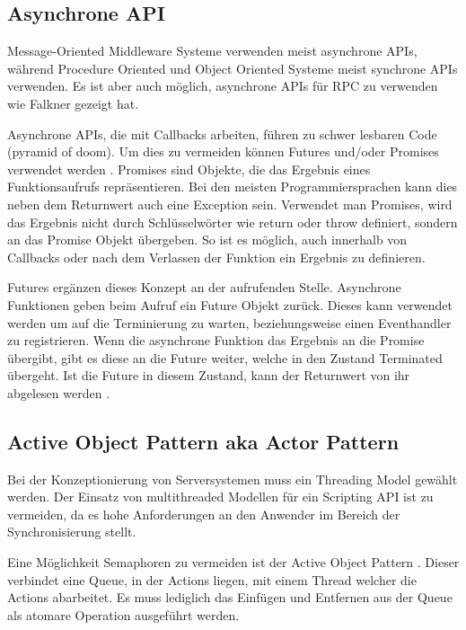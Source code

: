 \subsection{Asynchrone API}
Message-Oriented Middleware Systeme verwenden meist asynchrone APIs, während Procedure Oriented und Object Oriented Systeme meist synchrone APIs verwenden.
Es ist aber auch möglich, asynchrone APIs für RPC zu verwenden wie Falkner \cite{falkner1999implementing} gezeigt hat.

\label{future}
Asynchrone APIs, die mit Callbacks arbeiten, führen zu schwer lesbaren Code (pyramid of doom).
Um dies zu vermeiden können Futures und/oder Promises verwendet werden \cite{baker1977incremental}.
Promises sind Objekte, die das Ergebnis eines Funktionsaufrufs repräsentieren.
Bei den meisten Programmiersprachen kann dies neben dem Returnwert auch eine Exception sein.
Verwendet man Promises, wird das Ergebnis nicht durch Schlüsselwörter wie return oder throw definiert, sondern an das Promise Objekt übergeben.
So ist es möglich, auch innerhalb von Callbacks oder nach dem Verlassen der Funktion ein Ergebnis zu definieren.

Futures ergänzen dieses Konzept an der aufrufenden Stelle.
Asynchrone Funktionen geben beim Aufruf ein Future Objekt zurück.
Dieses kann verwendet werden um auf die Terminierung zu warten, beziehungsweise einen Eventhandler zu registrieren.
Wenn die asynchrone Funktion das Ergebnis an die Promise übergibt, gibt es diese an die Future weiter, welche in den Zustand Terminated übergeht.
Ist die Future in diesem Zustand, kann der Returnwert von ihr abgelesen werden \cite{baker1977incremental}.




\subsection{Active Object Pattern aka Actor Pattern}
Bei der Konzeptionierung von Serversystemen muss ein Threading Model gewählt werden.
Der Einsatz von multithreaded Modellen für ein Scripting API ist zu vermeiden, da es hohe Anforderungen an den Anwender im Bereich der Synchronisierung stellt.

Eine Möglichkeit Semaphoren zu vermeiden ist der Active Object Pattern \cite{schmidt2013pattern}.
Dieser verbindet eine Queue, in der Actions liegen, mit einem Thread welcher die Actions abarbeitet.
Es muss lediglich das Einfügen und Entfernen aus der Queue als atomare Operation ausgeführt werden.




